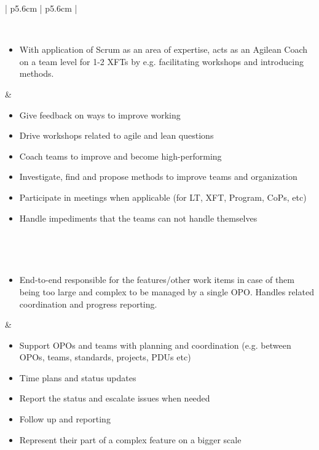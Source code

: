 \begin{table}
\begin{tabularx}{\textwidth}{ | p{5.6cm} | p{5.6cm} | }
   \\ \hline
   
   
   \\ \hline
   
   \begin{itemize}[label={}, leftmargin=*, topsep=0pt, itemsep=0pt, partopsep=0pt]
     \item With application of Scrum as an area of expertise, acts as an Agilean Coach on a team level for 1-2 XFTs by e.g. facilitating workshops and introducing methods.
   \end{itemize} & 
   
   \begin{itemize}[label={}, leftmargin=*, topsep=0pt, itemsep=0pt, partopsep=0pt]
     \item Give feedback on ways to improve working
     \item Drive workshops related to agile and lean questions
     \item Coach teams to improve and become high-performing
     \item Investigate, find and propose methods to improve teams and organization
     \item Participate in meetings when applicable (for LT, XFT, Program, CoPs, etc)
     \item Handle impediments that the teams can not handle themselves 
   \end{itemize} 
   
   \\ \hline

   
   \\ \hline
   
   \begin{itemize}[label={}, leftmargin=*, topsep=0pt, itemsep=0pt, partopsep=0pt]
     \item End-to-end responsible for the features/other work items in case of them being too large and complex to be managed by a single OPO. Handles related coordination and progress reporting. 
   \end{itemize} & 

   \begin{itemize}[label={}, leftmargin=*, topsep=0pt, itemsep=0pt, partopsep=0pt]
     \item Support OPOs and teams with planning and coordination (e.g. between OPOs, teams, standards, projects, PDUs etc)
     \item Time plans and status updates
     \item Report the status and escalate issues when needed
     \item Follow up and reporting
     \item Represent their part of a complex feature on a bigger scale 
   \end{itemize} 
   

\end{tabularx}
\end{table}
